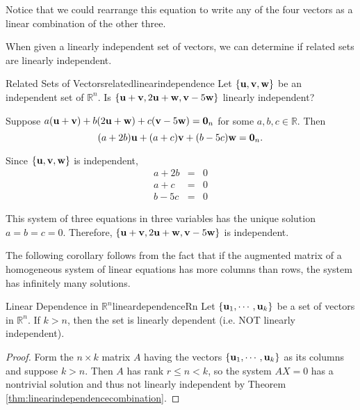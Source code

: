 \begin{solution}
Notice that we could rearrange this equation to write any of the four vectors as a linear combination of the other three. 
\end{solution}

When given a linearly independent set of vectors, we can determine if related sets are linearly independent. 

\begin{example}{Related Sets of Vectors}{relatedlinearindependence}
Let $\{ {\bf u},{\bf v},{\bf w}\}$ be an independent set of $\mathbb{R}^n$.
Is $\{{\bf u}+{\bf v}, 2{\bf u}+{\bf w}, {\bf v}-5{\bf w}\}$ linearly
independent?
\end{example}

\begin{solution}
Suppose $a({\bf u}+{\bf v}) + b(2{\bf u}+{\bf w}) + c({\bf v}-5{\bf w})={\bf 0}_n$
for some $a,b,c\in\mathbb{R}$.
Then 
\[ (a+2b){\bf u} + (a+c){\bf v} + (b-5c){\bf w}={\bf 0}_n.\]

Since $\{{\bf u},{\bf v},{\bf w}\}$ is independent, 
\begin{eqnarray*}
a + 2b & = & 0 \\
a + c & = & 0 \\
b - 5c & = & 0 
\end{eqnarray*}

This system of three equations in three variables has 
the unique solution $a=b=c=0$.
Therefore, $\{{\bf u}+{\bf v}, 2{\bf u}+{\bf w}, {\bf v}-5{\bf w}\}$ is independent.
\end{solution}

The following corollary follows from the fact that if the augmented matrix of a homogeneous
system of linear equations has more columns than rows, the system has infinitely many
solutions.

\begin{corollary}{Linear Dependence in $\mathbb{R}^{n}$}{lineardependenceRn}
Let $\left\{ {\bf u}_{1},\cdots ,{\bf u}_{k}\right\} $
be a set of vectors in $\mathbb{R}^{n}$. 
If $k>n$, then the set is linearly dependent (i.e. NOT linearly independent).
\end{corollary}

\begin{proof}
Form the $n \times k$ matrix $A$ having the vectors $\left\{
{\bf u}_{1},\cdots ,{\bf u}_{k}\right\} $ as its columns and suppose $k > n$. Then $A$ has rank $r \leq n <k$, so 
the system $AX=0$ has a nontrivial solution %
 and thus not linearly independent by Theorem 
 \ref{thm:linearindependencecombination}.
\end{proof}

